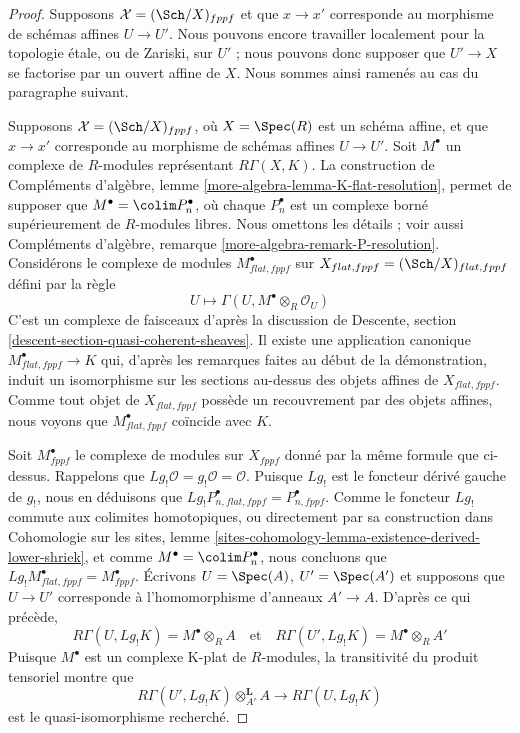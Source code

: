 \begin{proof}
\medskip\noindent
Supposons $\mathcal{X} = (\Sch/X)_{fppf}$ et que $x \to x'$ corresponde au
morphisme de schémas affines $U \to U'$. Nous pouvons encore travailler
localement pour la topologie étale, ou de Zariski, sur $U'$ ; nous pouvons donc
supposer que $U' \to X$ se factorise par un ouvert affine de $X$. Nous sommes
ainsi ramenés au cas du paragraphe suivant.

\medskip\noindent
Supposons $\mathcal{X} = (\Sch/X)_{fppf}$, où $X = \Spec(R)$ est un schéma
affine, et que $x \to x'$ corresponde au morphisme de schémas affines
$U \to U'$. Soit $M^\bullet$ un complexe de $R$-modules représentant
$R\Gamma(X, K)$. La construction de Compléments d'algèbre, lemme
\ref{more-algebra-lemma-K-flat-resolution}, permet de supposer que
$M^\bullet = \colim P_n^\bullet$, où chaque $P_n^\bullet$ est un complexe borné
supérieurement de $R$-modules libres. Nous omettons les détails ; voir aussi
Compléments d'algèbre, remarque \ref{more-algebra-remark-P-resolution}.
Considérons le complexe de modules $M^\bullet_{flat, fppf}$ sur
$X_{flat, fppf} = (\Sch/X)_{flat, fppf}$ défini par la règle
$$
U \longmapsto \Gamma(U, M^\bullet \otimes_R \mathcal{O}_U)
$$
C'est un complexe de faisceaux d'après la discussion de Descente, section
\ref{descent-section-quasi-coherent-sheaves}. Il existe une application
canonique $M^\bullet_{flat, fppf} \to K$ qui, d'après les remarques faites au
début de la démonstration, induit un isomorphisme sur les sections au-dessus des
objets affines de $X_{flat, fppf}$. Comme tout objet de $X_{flat, fppf}$ possède
un recouvrement par des objets affines, nous voyons que
$M^\bullet_{flat, fppf}$ coïncide avec $K$.

\medskip\noindent
Soit $M^\bullet_{fppf}$ le complexe de modules sur $X_{fppf}$ donné par la
même formule que ci-dessus. Rappelons que
$Lg_!\mathcal{O} = g_!\mathcal{O} = \mathcal{O}$. Puisque $Lg_!$ est le
foncteur dérivé gauche de $g_!$, nous en déduisons que
$Lg_!P_{n, flat, fppf}^\bullet = P_{n, fppf}^\bullet$. Comme le foncteur $Lg_!$
commute aux colimites homotopiques, ou directement par sa construction dans
Cohomologie sur les sites, lemme
\ref{sites-cohomology-lemma-existence-derived-lower-shriek}, et comme
$M^\bullet = \colim P_n^\bullet$, nous concluons que
$Lg_!M^\bullet_{flat, fppf} = M^\bullet_{fppf}$. Écrivons
$U = \Spec(A)$, $U' = \Spec(A')$ et supposons que $U \to U'$ corresponde à
l'homomorphisme d'anneaux $A' \to A$. D'après ce qui précède,
$$
R\Gamma(U, Lg_!K) = M^\bullet \otimes_R A
\quad\text{et}\quad
R\Gamma(U', Lg_!K) = M^\bullet \otimes_R A'
$$
Puisque $M^\bullet$ est un complexe K-plat de $R$-modules, la transitivité du
produit tensoriel montre que
$$
R\Gamma(U', Lg_!K) \otimes_{A'}^\mathbf{L} A
\longrightarrow
R\Gamma(U, Lg_!K)
$$
est le quasi-isomorphisme recherché.
\end{proof}

